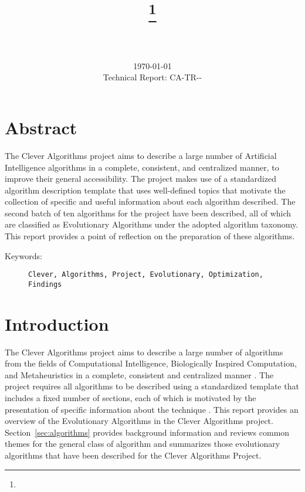 \documentclass[a4paper, 11pt]{article}
\title{{\myreporttitle}\footnote{\myreportlicense}}
\author{\myreportauthor\\{\myreportemail}\\\small\myreportproject}
\date{\today\\{\small{Technical Report: CA-TR-{\myreportdate}-\myreportversion}}}
\begin{document}
\maketitle

\section*{Abstract} 
The Clever Algorithms project aims to describe a large number of Artificial Intelligence algorithms in a complete, consistent, and centralized manner, to improve their general accessibility. 
The project makes use of a standardized algorithm description template that uses well-defined topics that motivate the collection of specific and useful information about each algorithm described.
The second batch of ten algorithms for the project have been described, all of which are classified as Evolutionary Algorithms under the adopted algorithm taxonomy.
This report provides a point of reflection on the preparation of these algorithms.

\begin{description}
	\item[Keywords:] {\small\texttt{Clever, Algorithms, Project, Evolutionary, Optimization, Findings}}
\end{description} 

\section{Introduction}
\label{sec:introduction}
The Clever Algorithms project aims to describe a large number of algorithms from the fields of Computational Intelligence, Biologically Inspired Computation, and Metaheuristics in a complete, consistent and centralized manner \cite{Brownlee2010}.
The project requires all algorithms to be described using a standardized template that includes a fixed number of sections, each of which is motivated by the presentation of specific information about the technique \cite{Brownlee2010a}.
This report provides an overview of the Evolutionary Algorithms in the Clever Algorithms project. 
Section~\ref{sec:algorithms} provides background information and reviews common themes for the general class of algorithm and summarizes those evolutionary algorithms that have been described for the Clever Algorithms Project.
\end{document}
